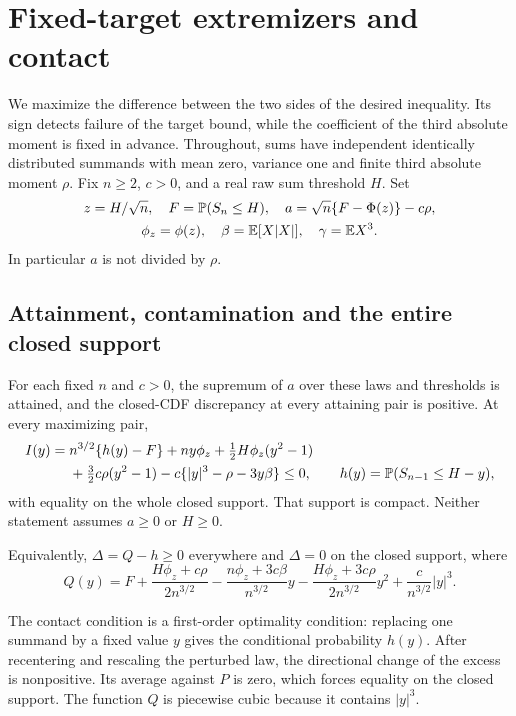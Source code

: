\section{Fixed-target extremizers and contact}
\label{v9:core:section}

We maximize the difference between the two sides of the desired
inequality. Its sign detects failure of the target bound, while the
coefficient of the third absolute moment is fixed in advance.
Throughout, sums have
independent identically distributed summands with mean zero, variance one
and finite third absolute moment $\rho$. Fix $n\ge2$, $c>0$, and a real
raw sum threshold $H$. Set
\begin{gather*}
 z=H/\sqrt n,\quad F=\mathbb P(S_n\le H),\quad
 a=\sqrt n\{F-\Phi(z)\}-c\rho,\\
 \phi_z=\phi(z),\quad\beta=\mathbb E[X|X|],\quad\gamma=\mathbb E X^3.
\end{gather*}
In particular $a$ is not divided by $\rho$.

\subsection{Attainment, contamination and the entire closed support}

\begin{proposition}\label{v9:core:attainment}
For each fixed $n$ and $c>0$, the supremum of $a$ over these laws and
thresholds is attained, and the closed-CDF discrepancy at every attaining
pair is positive.
At every maximizing pair,
\begin{align}
 I(y)={}&n^{3/2}\{h(y)-F\}+ny\phi_z
       +\tfrac12H\phi_z(y^2-1)\notag\\
 &+\tfrac32c\rho(y^2-1)-c\{|y|^3-\rho-3y\beta\}\le0,
 \qquad h(y)=\mathbb P(S_{n-1}\le H-y),\label{v9:core:contact}
\end{align}
with equality on the whole closed support. That support is compact.
Neither statement assumes $a\ge0$ or $H\ge0$.
\end{proposition}
Equivalently, $\Delta=Q-h\ge0$ everywhere and $\Delta=0$ on the closed
support, where
\begin{equation}\label{v9:core:Q}
 Q(y)=F+\frac{H\phi_z+c\rho}{2n^{3/2}}
 -\frac{n\phi_z+3c\beta}{n^{3/2}}y
 -\frac{H\phi_z+3c\rho}{2n^{3/2}}y^2
 +\frac c{n^{3/2}}|y|^3.
\end{equation}

The contact condition is a first-order optimality condition: replacing one
summand by a fixed value $y$ gives the conditional probability $h(y)$.
After recentering and rescaling the perturbed law, the directional
change of the excess is nonpositive. Its average against $P$ is zero,
which forces equality on the closed support. The function $Q$ is
piecewise cubic because it contains $|y|^3$.

